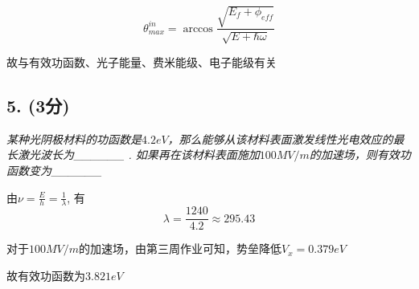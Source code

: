\documentclass{article}
\begin{document}
$$\theta_{max}^{in}=\arccos\frac{\sqrt{E_f+\phi_{eff}}}{\sqrt{E+\hbar\omega}}$$

故与有效功函数、光子能量、费米能级、电子能级有关

\subsection*{5. (3分)}

\emph{某种光阴极材料的功函数是$4.2eV$，那么能够从该材料表面激发线性光电效应的最长激光波长为\_\_\_\_\_\_ . 如果再在该材料表面施加$100MV/m$的加速场，则有效功函数变为\_\_\_\_\_\_}

由$\nu = \frac{E}{h} = \frac{1}{\lambda}$, 有$$\lambda = \frac{1240}{4.2} \approx 295.43$$

对于$100MV/m$的加速场，由第三周作业可知，势垒降低$V_x = 0.379eV$

故有效功函数为$3.821eV$
\end{document}
